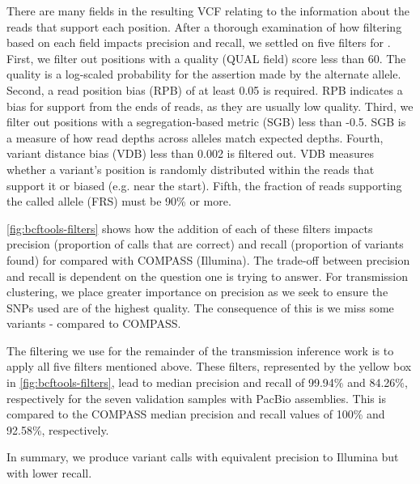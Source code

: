 There are many fields in the resulting VCF relating to the information about the reads that support each position. After a thorough examination of how filtering based on each field impacts precision and recall, we settled on five filters for \bcftools{}. First, we filter out positions with a quality (QUAL field) score less than 60. The quality is a log-scaled probability for the assertion made by the alternate allele. Second, a read position bias (RPB) of at least 0.05 is required. RPB indicates a bias for support from the ends of reads, as they are usually low quality. Third, we filter out positions with a segregation-based metric (SGB) less than -0.5. SGB is a measure of how read depths across alleles match expected depths. Fourth, variant distance bias (VDB) less than 0.002 is filtered out. VDB measures whether a variant's position is randomly distributed within the reads that support it or biased (e.g. near the start). Fifth, the fraction of reads supporting the called allele (FRS) must be 90\% or more.

\autoref{fig:bcftools-filters} shows how the addition of each of these filters impacts precision (proportion of calls that are correct) and recall (proportion of variants found) for \bcftools{} compared with COMPASS (Illumina). The trade-off between precision and recall is dependent on the question one is trying to answer. For transmission clustering, we place greater importance on precision as we seek to ensure the SNPs used are of the highest quality. The consequence of this is we miss some variants - compared to COMPASS.

The filtering we use for the remainder of the transmission inference
work is to apply all five filters mentioned above. These filters, represented by the yellow box in \autoref{fig:bcftools-filters}, lead to median precision and recall of 99.94\% and 84.26\%, respectively for the seven validation samples with PacBio assemblies. This is compared to the COMPASS median precision and recall values of 100\% and 92.58\%, respectively.

In summary, we produce \ont{} variant calls with equivalent precision to Illumina but with lower recall.

